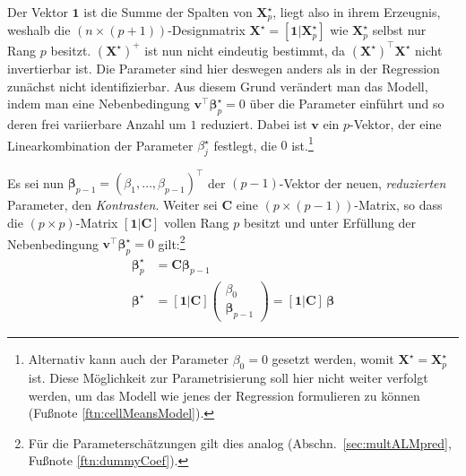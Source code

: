 Der Vektor $\bm{1}$ ist die Summe der Spalten von $\bm{X}_{p}^{\star}$, liegt also in ihrem Erzeugnis, weshalb die $(n \times (p+1))$-Designmatrix $\bm{X}^{\star} = [\bm{1}|\bm{X}_{p}^{\star}]$ wie $\bm{X}_{p}^{\star}$ selbst nur Rang $p$ besitzt. $(\bm{X}^{\star})^{+}$ ist nun nicht eindeutig bestimmt, da $(\bm{X}^{\star})^{\top} \bm{X}^{\star}$ nicht invertierbar ist. Die Parameter sind hier deswegen anders als in der Regression zunächst nicht identifizierbar. Aus diesem Grund verändert man das Modell, indem man eine Nebenbedingung $\bm{v}^{\top} \bm{\beta}_{p}^{\star} = 0$ über die Parameter einführt und so deren frei variierbare Anzahl um $1$ reduziert. Dabei ist $\bm{v}$ ein $p$-Vektor, der eine Linearkombination der Parameter $\beta_{j}^{\star}$ festlegt, die $0$ ist.\footnote{\label{ftn:cellMeans}Alternativ kann auch der Parameter $\beta_{0} = 0$ gesetzt werden, womit $\bm{X}^{\star} = \bm{X}^{\star}_{p}$ ist. Diese Möglichkeit zur Parametrisierung soll hier nicht weiter verfolgt werden, um das Modell wie jenes der Regression formulieren zu können (Fußnote \ref{ftn:cellMeansModel}).}

Es sei nun $\bm{\beta}_{p-1} = (\beta_{1}, \ldots, \beta_{p-1})^{\top}$ der $(p-1)$-Vektor der neuen, \emph{reduzierten} Parameter, den \emph{Kontrasten}. Weiter sei $\bm{C}$ eine $(p \times (p-1))$-Matrix, so dass die $(p \times p)$-Matrix $[\bm{1} | \bm{C}]$ vollen Rang $p$ besitzt und unter Erfüllung der Nebenbedingung $\bm{v}^{\top} \bm{\beta}_{p}^{\star} = 0$ gilt:\footnote{Für die Parameterschätzungen gilt dies analog (Abschn.\ \ref{sec:multALMpred}, Fußnote \ref{ftn:dummyCoef}).}
\begin{align*}
\bm{\beta}_{p}^{\star} &= \bm{C} \bm{\beta}_{p-1}\\
\bm{\beta}^{\star} &= [\bm{1} | \bm{C}] \left(\begin{array}{l}\beta_{0} \\ \bm{\beta}_{p-1}\end{array}\right) = [\bm{1} | \bm{C}] \, \bm{\beta}
\end{align*}

